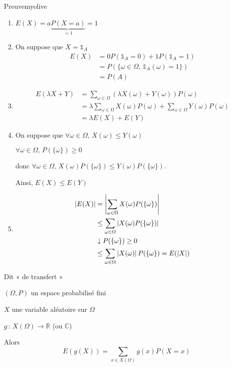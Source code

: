     \begin{demo}{Preuve}{myolive}
        \begin{enumerate}
            \item $E(X) = a\underbrace{P(X=a)}_{=1} = 1$
            \item On suppose que $X= \mathbb{1}_A$
            \begin{align*}
                E(X) &= 0P(\mathbb{1}_A =0) + 1P(\mathbb{1}_A = 1) \\
                &= P(\{ \omega \in \Omega, \, \mathbb{1}_A(\omega) = 1 \}) \\
                &= P(A)
            \end{align*}
            \item \begin{align*}
                E(\lambda X + Y) &= \sum\limits_{\omega \in \Omega} (\lambda X(\omega) + Y(\omega))P(\omega) \\
                &= \lambda \sum\limits_{\omega \in \Omega} X(\omega) P(\omega) + \sum\limits_{\omega \in \Omega} Y(\omega) P(\omega) \\
                &= \lambda E(X) + E(Y)
            \end{align*}
            \item On suppose que $\forall \omega \in \Omega, \, X(\omega) \leq Y(\omega)$
             
            $\forall \omega \in \Omega, \, P(\{ \omega \}) \geq 0$ 
         
            donc $\forall \omega \in \Omega, \, X(\omega) P(\{ \omega \}) \leq Y(\omega)P(\{ \omega \})$. 
            
            Ainsi, $E(X) \leq E(Y)$
            \item \begin{align*}
                \left\lvert E(X)\right\rvert &= \left\lvert \sum\limits_{\omega \in \Omega} X(\omega)P(\{ \omega \})\right\rvert \\
                &\leq \sum\limits_{\omega \in \Omega} \left\lvert X(\omega)P(\{ \omega \})\right\rvert \\
                & \downarrow P(\{\omega\}) \geq 0 \\
                &\leq \sum\limits_{\omega \in \Omega} \left\lvert X(\omega)\right\rvert P(\{ \omega \}) = E(\left\lvert X\right\rvert)
            \end{align*}
        \end{enumerate}
    \end{demo}

    \begin{theo}{Dit « de transfert »}{}
        \begin{soient}
            \item $(\Omega,P)$ un espace probabilisé fini
            \item $X$ une variable aléatoire sur $\Omega$
            \item $g \, : \, X(\Omega) \longrightarrow \mathbb{R}$ (ou $\mathbb{C}$)
        \end{soient}
        Alors 
        \[ E(g(X)) = \sum\limits_{x \in X(\Omega)} g(x) P(X = x) \] 
    \end{theo}


